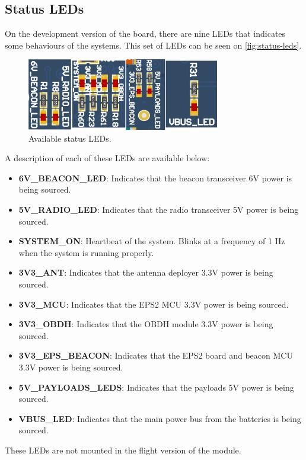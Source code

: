 \subsection{Status LEDs} \label{status-leds}

On the development version of the board, there are nine LEDs that indicates some behaviours of the systems. This set of LEDs can be seen on \autoref{fig:status-leds}.

\begin{figure}[!ht]
    \begin{center}
        \includegraphics[width=0.75\textwidth]{figures/status_leds.png}
        \caption{Available status LEDs.}
        \label{fig:status-leds}
    \end{center}
\end{figure}

A description of each of these LEDs are available below:

\begin{itemize}
    \item \textbf{6V\_BEACON\_LED}: Indicates that the beacon transceiver 6V power is being sourced.
    \item \textbf{5V\_RADIO\_LED}: Indicates that the radio transceiver 5V power is being sourced.
    \item \textbf{SYSTEM\_ON}: Heartbeat of the system. Blinks at a frequency of 1 Hz when the system is running properly.
    \item \textbf{3V3\_ANT}: Indicates that the antenna deployer 3.3V power is being sourced.
    \item \textbf{3V3\_MCU}: Indicates that the EPS2 MCU 3.3V power is being sourced.
    \item \textbf{3V3\_OBDH}: Indicates that the OBDH module 3.3V power is being sourced.
    \item \textbf{3V3\_EPS\_BEACON}: Indicates that the EPS2 board and beacon MCU 3.3V power is being sourced.
    \item \textbf{5V\_PAYLOADS\_LEDS}: Indicates that the payloads 5V power is being sourced.
    \item \textbf{VBUS\_LED}: Indicates that the main power bus from the batteries is being sourced.
\end{itemize}

These LEDs are not mounted in the flight version of the module.